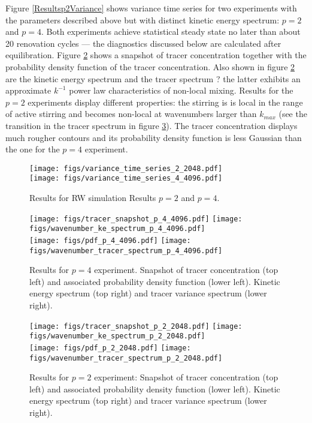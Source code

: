 \documentclass[11pt]{article}
\begin{document}
Figure \eqref{Resultsp2Variance} shows  variance time series for two experiments with the parameters described above but with distinct kinetic energy spectrum: $p=2$ and $p=4$. Both experiments achieve statistical steady state  no later than about 20 renovation cycles --- the diagnostics discussed below are calculated after equilibration. Figure \ref{Resultsp4} shows a snapshot of tracer concentration together with the probability density function of the tracer concentration. Also shown in figure
  \ref{Resultsp4} are the kinetic energy spectrum and the tracer spectrum ? the latter exhibits an approximate $k^{-1}$ power law characteristics of non-local mixing. Results for the $p=2$ experiments display different properties: the stirring is is local in the range of active stirring and becomes non-local at wavenumbers larger than $k_{max}$ (see the transition in the tracer spectrum in figure \ref{Resultsp2}). The tracer concentration displays much rougher contours and its probability density function is less Gaussian than the one for the $p=4$ experiment.

\begin{figure}[ht]
    \centering
            \texttt{[image: figs/variance\_time\_series\_2\_2048.pdf]}\\
                        \texttt{[image: figs/variance\_time\_series\_4\_4096.pdf]}\\
       \caption{\small Results for RW simulation  Results $p=2$ and $p=4$.}
		    \label{Resultsp2Variance}
\end{figure}

\begin{figure}[ht]
    \centering
       \texttt{[image: figs/tracer\_snapshot\_p\_4\_4096.pdf]}
       \texttt{[image: figs/wavenumber\_ke\_spectrum\_p\_4\_4096.pdf]}\\
         \texttt{[image: figs/pdf\_p\_4\_4096.pdf]}
       \texttt{[image: figs/wavenumber\_tracer\_spectrum\_p\_4\_4096.pdf]}
       \caption{\small Results for $p=4$ experiment. Snapshot of tracer concentration (top left)  and associated
       			probability density function (lower left). Kinetic energy spectrum (top right) and 
			tracer variance spectrum (lower right).}
		    \label{Resultsp4}
\end{figure}



\begin{figure}[ht]
    \centering
       \texttt{[image: figs/tracer\_snapshot\_p\_2\_2048.pdf]}
       \texttt{[image: figs/wavenumber\_ke\_spectrum\_p\_2\_2048.pdf]}\\
         \texttt{[image: figs/pdf\_p\_2\_2048.pdf]}
       \texttt{[image: figs/wavenumber\_tracer\_spectrum\_p\_2\_2048.pdf]}
       \caption{\small Results for $p=2$ experiment: Snapshot of tracer concentration (top left)  and associated
       			probability density function (lower left). Kinetic energy spectrum (top right) and 
			tracer variance spectrum (lower right).}
		    \label{Resultsp2}
\end{figure}
\end{document}
